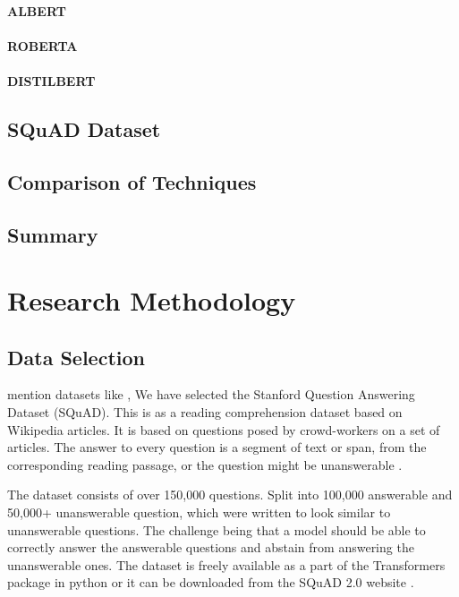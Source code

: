 \documentclass[a4paper,12pt]{report}
\begin{document}
	       \subsubsection{ALBERT}\label{2322}
	       \cite{albert}

	       \subsubsection{ROBERTA}\label{2323}
	       \cite{roberta}

	       \subsubsection{DISTILBERT}\label{2324}
	       \cite{distil}
        \section{SQuAD Dataset}\label{24}
        \section{Comparison of Techniques}\label{25}
        \section{Summary}\label{26}
        \citep{RAM}

    \chapter{\centering Research Methodology}\label{c3researchmeth}

    \section{Data Selection}\label{c31}
    
    mention datasets like \cite{lstmInsuranceQA}, 
    	We have selected the Stanford Question Answering Dataset (SQuAD). This is as a reading comprehension dataset based on Wikipedia articles. It is based on questions posed by crowd-workers on a set of articles. The answer to every question is a segment of text or span, from the corresponding reading passage, or the question might be unanswerable \citep{dataset}.

    	The dataset consists of over 150,000 questions. Split into 100,000 answerable and 50,000+ unanswerable question, which were written to look similar to unanswerable questions. The challenge being that a model should be able to correctly answer the answerable questions and abstain from answering the unanswerable ones.
	    The dataset is freely available as a part of the Transformers package in python or it can be downloaded from the SQuAD 2.0 website \citep{squad}.
	
\end{document}
